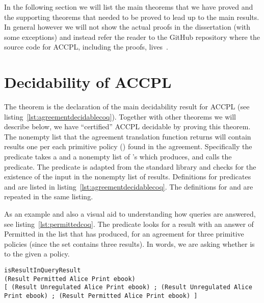 In the following section we will list the main theorems that we have proved and the supporting theorems that needed to be proved to lead up to the main results. In general however we will not show the actual proofs in the dissertation (with some exceptions) and instead refer the reader to the GitHub repository where the source code for \ac{ACCPL}, including the proofs, lives~\cite{BahmanSistany2015}.

\section{Decidability of ACCPL}\label{sec:maintheorems}

The theorem  is the declaration of the main decidability result for \ac{ACCPL} (see listing~\ref{lst:agreementdecidablecoq}). Together with other theorems we will describe below, we have ``certified'' \ac{ACCPL} decidable by proving this theorem. The nonempty list that the agreement translation function  returns will contain results one per each primitive policy () found in the agreement. Specifically the predicate  takes a  and a nonempty list of 's which  produces, and calls the  predicate. The  predicate is adapted from the  standard library and checks for the existence of the input  in the nonempty list of results. Definitions for predicates  and  are listed in listing~\ref{lst:agreementdecidablecoq}. The definitions for  and  are repeated in the same listing. 

As an example and also a visual aid to understanding how queries are answered, see listing~\ref{lst:permittedcoq}. The  predicate looks for a result with an answer of Permitted in the list that  has produced, for an agreement for three primitive policies (since the set contains three results). In words, we are asking whether  is  to  the  given a policy. 

\begin{lstlisting}
isResultInQueryResult
(Result Permitted Alice Print ebook) 
[ (Result Unregulated Alice Print ebook) ; (Result Unregulated Alice Print ebook) ; (Result Permitted Alice Print ebook) ]
\end{lstlisting}
    
